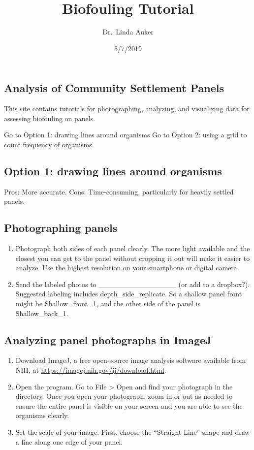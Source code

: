 \documentclass[]{article}
\title{Biofouling Tutorial}
\author{Dr.~Linda Auker}
\date{5/7/2019}
\begin{document}
\maketitle

\subsection{Analysis of Community Settlement
Panels}\label{analysis-of-community-settlement-panels}

This site contains tutorials for photographing, analyzing, and
visualizing data for assessing biofouling on panels.

 Go to Option 1: drawing lines around organisms Go to Option 2: using a
grid to count frequency of organisms

\subsection{Option 1: drawing lines around organisms}\label{Option1}

Pros: More accurate. Cons: Time-consuming, particularly for heavily
settled panels.

\subsection{Photographing panels}\label{photographing-panels}

\begin{enumerate}
\def\labelenumi{\arabic{enumi}.}
\item
  Photograph both sides of each panel clearly. The more light available
  and the closest you can get to the panel without cropping it out will
  make it easier to analyze. Use the highest resolution on your
  smartphone or digital camera.
\item
  Send the labeled photos to \_\_\_\_\_\_\_\_\_\_\_\_\_\_\_ (or add to a
  dropbox?). Suggested labeling includes depth\_side\_replicate. So a
  shallow panel front might be Shallow\_front\_1, and the other side of
  the panel is Shallow\_back\_1.
\end{enumerate}

\subsection{Analyzing panel photographs in
ImageJ}\label{analyzing-panel-photographs-in-imagej}

\begin{enumerate}
\def\labelenumi{\arabic{enumi}.}
\item
  Download ImageJ, a free open-source image analysis software available
  from NIH, at \url{https://imagej.nih.gov/ij/download.html}.
\item
  Open the program. Go to File \textgreater{} Open and find your
  photograph in the directory. Once you open your photograph, zoom in or
  out as needed to ensure the entire panel is visible on your screen and
  you are able to see the organisms clearly.
\item
  Set the scale of your image. First, choose the ``Straight Line'' shape
  and draw a line along one edge of your panel.
\end{enumerate}
\end{document}
